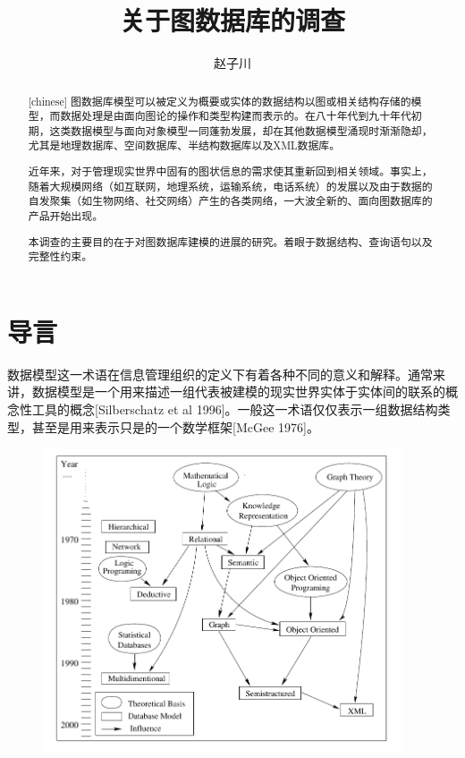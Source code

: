 \documentclass[a4paper]{ecust_thesis_translation}
\author{赵子川}
\title{关于图数据库的调查}
\begin{document}
\setlength{\parindent}{2em}

\maketitle

\begin{abstract}[chinese]
	图数据库模型可以被定义为概要或实体的数据结构以图或相关结构存储的模型，而数据处理是由面向图论的操作和类型构建而表示的。在八十年代到九十年代初期，这类数据模型与面向对象模型一同蓬勃发展，却在其他数据模型涌现时渐渐隐却，尤其是地理数据库、空间数据库、半结构数据库以及XML数据库。 

	近年来，对于管理现实世界中固有的图状信息的需求使其重新回到相关领域。事实上，随着大规模网络（如互联网，地理系统，运输系统，电话系统）的发展以及由于数据的自发聚集（如生物网络、社交网络）产生的各类网络，一大波全新的、面向图数据库的产品开始出现。 

	本调查的主要目的在于对图数据库建模的进展的研究。着眼于数据结构、查询语句以及完整性约束。
\end{abstract}

\section{导言}
	数据模型这一术语在信息管理组织的定义下有着各种不同的意义和解释。通常来讲，数据模型是一个用来描述一组代表被建模的现实世界实体于实体间的联系的概念性工具的概念[Silberschatz et al 1996]。一般这一术语仅仅表示一组数据结构类型，甚至是用来表示只是的一个数学框架[McGee 1976]。

		\begin{center}
			\begin{figure}[!h]
				\centering
				\includegraphics[width=0.95\textwidth]{img/pic1.png}
			\end{figure}
		\end{center}
\end{document}
